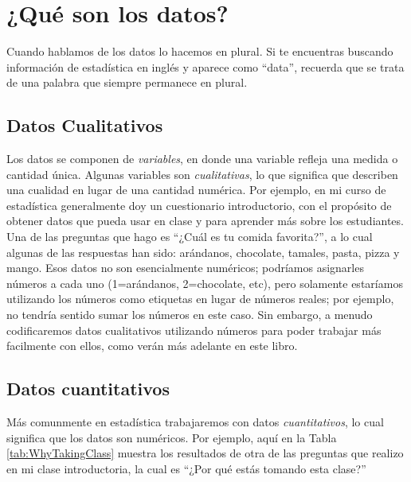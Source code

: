 \documentclass[
  12pt,
]{book}
\begin{document}
\hypertarget{quuxe9-son-los-datos}{%
\section{¿Qué son los datos?}\label{quuxe9-son-los-datos}}

Cuando hablamos de los datos lo hacemos en plural. Si te encuentras buscando información de estadística en inglés y aparece como ``data'', recuerda que se trata de una palabra que siempre permanece en plural.

\hypertarget{datos-cualitativos}{%
\subsection{Datos Cualitativos}\label{datos-cualitativos}}

Los datos se componen de \emph{variables}, en donde una variable refleja una medida o cantidad única. Algunas variables son \emph{cualitativas}, lo que significa que describen una cualidad en lugar de una cantidad numérica. Por ejemplo, en mi curso de estadística generalmente doy un cuestionario introductorio, con el propósito de obtener datos que pueda usar en clase y para aprender más sobre los estudiantes. Una de las preguntas que hago es ``¿Cuál es tu comida favorita?'', a lo cual algunas de las respuestas han sido: arándanos, chocolate, tamales, pasta, pizza y mango. Esos datos no son esencialmente numéricos; podríamos asignarles números a cada uno (1=arándanos, 2=chocolate, etc), pero solamente estaríamos utilizando los números como etiquetas en lugar de números reales; por ejemplo, no tendría sentido sumar los números en este caso. Sin embargo, a menudo codificaremos datos cualitativos utilizando números para poder trabajar más facilmente con ellos, como verán más adelante en este libro.

\hypertarget{datos-cuantitativos}{%
\subsection{Datos cuantitativos}\label{datos-cuantitativos}}

Más comunmente en estadística trabajaremos con datos \emph{cuantitativos}, lo cual significa que los datos son numéricos. Por ejemplo, aquí en la Tabla \ref{tab:WhyTakingClass} muestra los resultados de otra de las preguntas que realizo en mi clase introductoria, la cual es ``¿Por qué estás tomando esta clase?''
\end{document}
